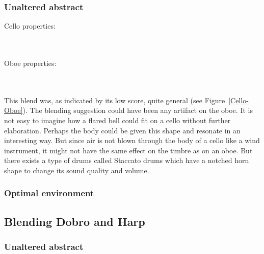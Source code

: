 \subsubsection{Unaltered abstract}

Cello properties:

\noindent{}
\\\\Oboe properties:


\noindent{}	
\\\\This blend was, as indicated by its low score, quite general (see Figure~\ref{Cello-Oboe}). The blending suggestion could have been any artifact on the oboe. It is not easy to imagine how a flared bell could fit on a cello without further elaboration. Perhaps the body could be given this shape and resonate in an interesting way. But since air is not blown through the body of a cello like a wind instrument, it might not have the same effect on the timbre as on an oboe. But there exists a type of drums called Staccato drums which have a notched horn shape to change its sound quality and volume.

\subsubsection{Optimal environment}

\subsection{Blending Dobro and Harp }
\subsubsection{Unaltered abstract}

